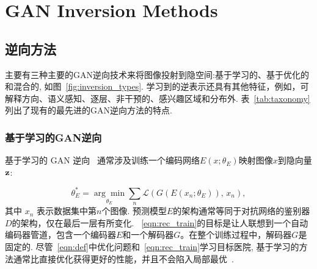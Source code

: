 \section{GAN Inversion Methods}
\label{sec:model}



\subsection{逆向方法}
\label{sec:techniques}
主要有三种主要的GAN逆向技术来将图像投射到隐空间:基于学习的、基于优化的和混合的, 如图~\ref{fig:inversion_types}.
学习到的逆表示还具有其他特征，例如，可解释方向、语义感知、逐层、非干预的、感兴趣区域和分布外. 
表~\ref{tab:taxonomy} 列出了现有的最先进的GAN逆向方法的特点.

\figtype

\subsubsection{基于学习的GAN逆向}
\label{sec:learning-based}
基于学习的 GAN 逆向~\cite{perarnau2016invertible,zhu2016generative,bau2019inverting} 通常涉及训练一个编码网络$E(x; \theta_E)$映射图像$x$到隐向量$\mathbf{z}$:

\begin{equation}
\theta_E^* = \underset{\theta_E}{\arg\min} \sum_{n} \mathcal{L} (G(E(x_n; \theta_E)), \,x_n),
\label{eqn:rec_train}
\end{equation}
其中 $x_n$ 表示数据集中第$n$个图像.
预测模型$E$的架构通常等同于对抗网络的鉴别器$D$的架构，仅在最后一层有所变化.
~\eqref{eqn:rec_train}的目标是让人联想到一个自动编码器管道，包含一个编码器$E$和一个解码器$G$。在整个训练过程中，解码器$G$是固定的.
尽管~\eqref{eqn:def}中优化问题和~\eqref{eqn:rec_train}学习目标医院, 基于学习的方法通常比直接优化获得更好的性能，并且不会陷入局部最优~\cite{zhu2016generative,aberdam2020invert}.

